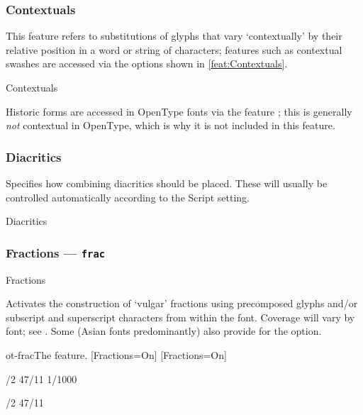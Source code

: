\documentclass[a4paper]{l3doc}
\begin{document}
\subsubsection{Contextuals}
This feature refers to substitutions of glyphs that vary `contextually' by their relative position in a word or string of characters;
features such as contextual swashes are accessed via the options shown in \ref{feat:Contextuals}.

\begin{features}{Contextuals}
\end{features}

Historic forms are accessed in OpenType
fonts via the feature ; this is generally \emph{not}
contextual in OpenType, which is why it is not included in this feature.


\subsubsection{Diacritics}

Specifies how combining diacritics should be placed.
These will usually be controlled automatically
according to the Script setting.

\begin{features}{Diacritics}
\end{features}


\subsubsection{Fractions --- \texttt{frac}}

\begin{features}{Fractions}
\end{features}

Activates the construction of `vulgar' fractions using precomposed glyphs and/or
subscript and superscript characters from within the font.
Coverage will vary by font; see .
Some (Asian fonts predominantly) also provide for the  option.

\begin{Lexample}{ot-frac}{The  feature.}
\setsansfont{Lato}[Fractions=On]
\setmonofont{IBM Plex Mono}[Fractions=On]

/2 47/11 1/1000 \par
{}/2 47/11
\end{Lexample}
\end{document}
